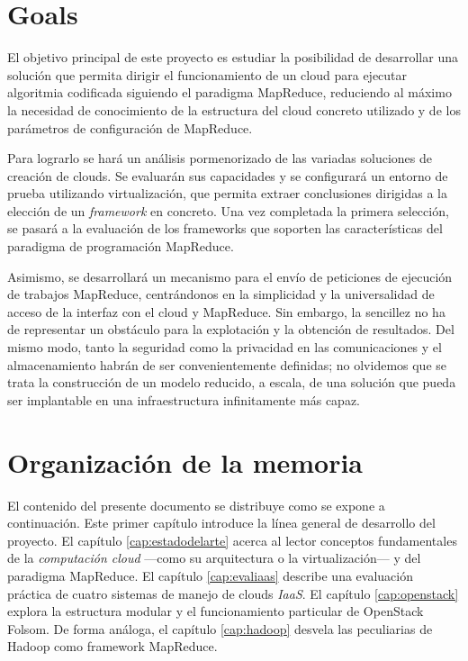 \section{Goals}\label{sec:objetivos}

\noindent El objetivo principal de este proyecto es estudiar la posibilidad de desarrollar una soluci\'on que permita dirigir el funcionamiento de un cloud para ejecutar algoritmia codificada siguiendo el paradigma MapReduce, reduciendo al m\'aximo la necesidad de conocimiento de la estructura del cloud concreto utilizado y de los par\'ametros de configuraci\'on de MapReduce.\newline

Para lograrlo se har\'a un an\'alisis pormenorizado de las variadas soluciones de creaci\'on de clouds. Se evaluar\'an sus capacidades y se configurar\'a un entorno de prueba utilizando virtualizaci\'on, que permita extraer conclusiones dirigidas a la elecci\'on de un \emph{framework} en concreto. Una vez completada la primera selecci\'on, se pasar\'a a la evaluaci\'on de los frameworks que soporten las caracter\'isticas del paradigma de programaci\'on MapReduce.\newline

Asimismo, se desarrollar\'a un mecanismo para el env\'io de peticiones de ejecuci\'on de trabajos MapReduce, centr\'andonos en la simplicidad y la universalidad de acceso de la interfaz con el cloud y MapReduce. Sin embargo, la sencillez no ha de representar un obst\'aculo para la explotaci\'on y la obtenci\'on de resultados. Del mismo modo, tanto la seguridad como la privacidad en las comunicaciones y el almacenamiento habr\'an de ser convenientemente definidas; no olvidemos que se trata la construcci\'on de un modelo reducido, a escala, de una soluci\'on que pueda ser implantable en una infraestructura infinitamente m\'as capaz.


\section{Organizaci\'on de la memoria}\label{sec:organizacion}
\noindent El contenido del presente documento se distribuye como se expone a continuaci\'on. Este primer cap\'itulo introduce la l\'inea general de desarrollo del proyecto. El cap\'itulo \ref{cap:estadodelarte} acerca al lector conceptos fundamentales de la \emph{computaci\'on cloud} ---como su arquitectura o la virtualizaci\'on--- y del paradigma MapReduce. El cap\'itulo \ref{cap:evaliaas} describe una evaluaci\'on pr\'actica de cuatro sistemas de manejo de clouds \emph{IaaS}. El cap\'itulo \ref{cap:openstack} explora la estructura modular y el funcionamiento particular de OpenStack Folsom. De forma an\'aloga, el cap\'itulo \ref{cap:hadoop} desvela las peculiarias de Hadoop como framework MapReduce. \newline

